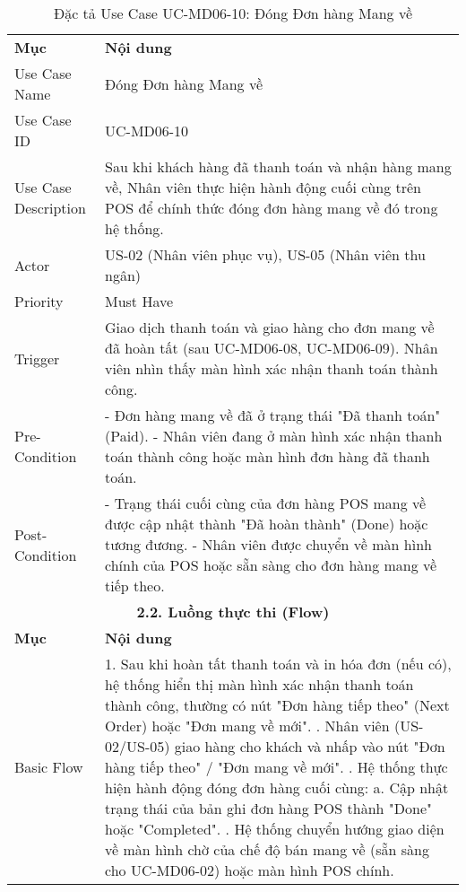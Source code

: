 \begin{longtable}{|m{4cm}|p{11cm}|}
\caption{Đặc tả Use Case UC-MD06-10: Đóng Đơn hàng Mang về} \label{tab:uc_md06_10} \\
\hline

\endhead %
\hline
\endfoot %
\hline
\endlastfoot %
\multicolumn{2}{|c|}{\textbf{2.1. Tóm tắt (Summary)}} \\
\hline
\textbf{Mục} & \textbf{Nội dung} \\
\hline
Use Case Name & Đóng Đơn hàng Mang về \\
\hline
Use Case ID & UC-MD06-10 \\
\hline
Use Case Description & Sau khi khách hàng đã thanh toán và nhận hàng mang về, Nhân viên thực hiện hành động cuối cùng trên POS để chính thức đóng đơn hàng mang về đó trong hệ thống. \\
\hline
Actor & US-02 (Nhân viên phục vụ), US-05 (Nhân viên thu ngân) \\
\hline
Priority & Must Have \\
\hline
Trigger & Giao dịch thanh toán và giao hàng cho đơn mang về đã hoàn tất (sau UC-MD06-08, UC-MD06-09). Nhân viên nhìn thấy màn hình xác nhận thanh toán thành công. \\
\hline
Pre-Condition & - Đơn hàng mang về đã ở trạng thái "Đã thanh toán" (Paid). \newline - Nhân viên đang ở màn hình xác nhận thanh toán thành công hoặc màn hình đơn hàng đã thanh toán. \\
\hline
Post-Condition & - Trạng thái cuối cùng của đơn hàng POS mang về được cập nhật thành "Đã hoàn thành" (Done) hoặc tương đương. \newline - Nhân viên được chuyển về màn hình chính của POS hoặc sẵn sàng cho đơn hàng mang về tiếp theo. \\
\hline
\multicolumn{2}{|c|}{\textbf{2.2. Luồng thực thi (Flow)}} \\
\hline
\textbf{Mục} & \textbf{Nội dung} \\
\hline
Basic Flow & 1. Sau khi hoàn tất thanh toán và in hóa đơn (nếu có), hệ thống hiển thị màn hình xác nhận thanh toán thành công, thường có nút "Đơn hàng tiếp theo" (Next Order) hoặc "Đơn mang về mới". \newline 2. Nhân viên (US-02/US-05) giao hàng cho khách và nhấp vào nút "Đơn hàng tiếp theo" / "Đơn mang về mới". \newline 3. Hệ thống thực hiện hành động đóng đơn hàng cuối cùng: \newline    a. Cập nhật trạng thái của bản ghi đơn hàng POS thành "Done" hoặc "Completed". \newline 4. Hệ thống chuyển hướng giao diện về màn hình chờ của chế độ bán mang về (sẵn sàng cho UC-MD06-02) hoặc màn hình POS chính. \\

\end{longtable}
